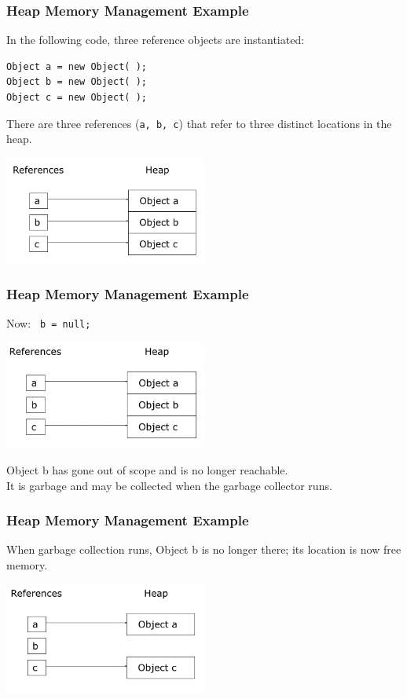 \begin{frame}[fragile]
\frametitle{Heap Memory Management Example}

In the following code, three reference objects are instantiated:

\begin{verbatim}
Object a = new Object( );
Object b = new Object( );
Object c = new Object( );
\end{verbatim}

There are three references (\texttt{a, b, c}) that refer to three distinct locations in the heap.

\begin{center}
\includegraphics[width=0.5\textwidth]{images/heapABC.png}
\end{center}

\end{frame}

\begin{frame}
\frametitle{Heap Memory Management Example}

Now: \texttt{ b = null; }

\begin{center}
\includegraphics[width=0.5\textwidth]{images/heapAC.png}
\end{center}

Object b has gone out of scope and is no longer reachable.\\
\quad It is garbage and may be collected when the garbage collector runs.

\end{frame}

\begin{frame}
\frametitle{Heap Memory Management Example}

When garbage collection runs, Object b is no longer there; its location is now free memory.

\begin{center}
\includegraphics[width=0.5\textwidth]{images/heapNoB.png}
\end{center}

\end{frame}

